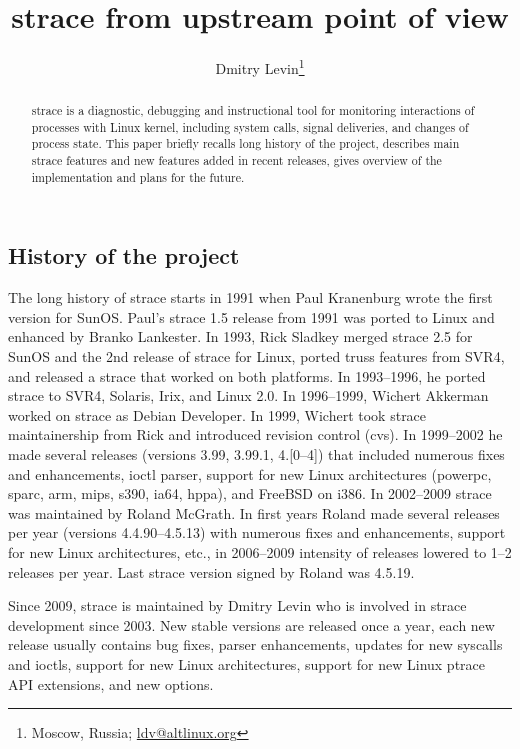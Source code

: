 \documentclass[10pt, a5paper]{article}
\begin{document}
\title{strace from upstream point of view}%

\author{Dmitry Levin\footnote{Moscow, Russia; \url{ldv@altlinux.org}}}
\maketitle

\begin{abstract}
strace is a diagnostic, debugging and instructional tool for \linebreak monitoring interactions of processes with Linux kernel, including system calls, signal deliveries, and changes of process state. This paper briefly recalls long history of the project, describes main strace features and new features added in recent releases, gives overview of the implementation and plans for the future.
\end{abstract}

\subsection*{History of the project}

The long history of strace starts in 1991 when Paul Kranenburg wrote the first version for SunOS.
Paul's strace 1.5 release from 1991 was ported to Linux and enhanced by Branko Lankester.
In 1993, Rick Sladkey merged strace 2.5 for SunOS and the 2nd release of strace for Linux, ported truss features from SVR4, and released a strace that worked on both platforms.  In 1993--1996, he ported strace to SVR4, Solaris, Irix, and Linux 2.0.
In 1996--1999, Wichert Akkerman worked on strace as Debian Developer.
In 1999, Wichert took strace maintainership from Rick and introduced revision control (cvs).  In 1999--2002 he made several releases (versions 3.99, 3.99.1, 4.[0--4]) that included numerous fixes and enhancements, ioctl parser, support for new Linux architectures (powerpc, sparc, arm, mips, s390, ia64, hppa), and FreeBSD on i386.
In 2002--2009 strace was maintained by Roland McGrath.  In first years Roland made several releases per year (versions 4.4.90--4.5.13) with numerous fixes and enhancements, support for new Linux architectures, etc., in 2006--2009 intensity of releases lowered to 1--2 releases per year. Last strace version signed by Roland was 4.5.19.

Since 2009, strace is maintained by Dmitry Levin who is involved in strace development since 2003.  New stable versions are released once a year, each new release usually contains bug fixes, parser enhancements, updates for new syscalls and ioctls, support for new Linux architectures, support for new Linux ptrace API extensions, and new options.
\end{document}
